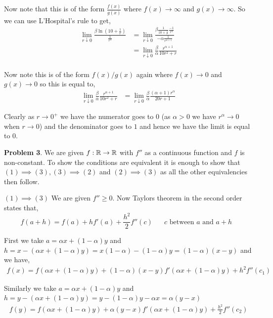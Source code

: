 \documentclass[a4paper]{article}
\begin{document}
Now note that this is of the form $\frac{f(x)}{g(x)}$ where $f(x) \to \infty$ and $g(x) \to \infty$. So we can use L'Hospital's rule to get, 
\begin{align*}
    \lim_{r \downarrow 0} \frac{\beta \ln  \left ( 10 + \frac{1}{r}\right )}{\frac{1}{r^{\alpha}}} &=  \lim_{r \downarrow 0}  \frac{\beta \frac{1}{10 + \frac{1}{r}} \frac{-1}{r^2}}{-\alpha \frac{1}{r^{\alpha + 1}}}\\
&=   \lim_{r \downarrow 0}  \frac{\beta}{\alpha} \frac{r^{\alpha + 1}}{10r^2 + r}\\
\end{align*}            

Now note this is of the form $f(x) / g(x) $ again where $f(x) \to 0$ and $g(x) \to 0$ so this is equal to, 
\begin{align*}
    \lim_{r \downarrow 0}  \frac{\beta}{\alpha} \frac{r^{\alpha + 1}}{10r^2 + r} &=     \lim_{r \downarrow 0}  \frac{\beta}{\alpha} \frac{(\alpha + 1)r^{\alpha}}{20r +  1}
\end{align*}

Clearly as $r \to 0^{+}$ we have the numerator goes to $0$ (as $\alpha > 0$ we have $r^{\alpha} \to 0$ when $r \to 0$) and the denominator goes to $1$ and hence we have the limit is equal to $0$.



\vspace{1em}


\textbf{Problem 3}. We are given $f: \mathbb{R} \to \mathbb{R}$ with $f''$ as a continuous function and $f$ is non-constant. To show the conditions are equivalent it is enough to show that $(1) \implies (3), (3) \implies (2)$ and $(2) \implies (3)$ as all the other equivalencies then follow.

\vspace{1em}
$(1) \implies (3)$ We are given $f'' \ge 0$. Now Taylors theorem in the second order states that,
\[
    f(a + h) = f(a) + hf'(a) + \frac{h^2}{2}f''(c) \quad \text{ $c$ between $a$ and $a + h$ }
\]

First we take $a = \alpha x + (1 - \alpha) y$ and $h = x - (\alpha x + (1 - \alpha) y) = x(1 - \alpha) - (1- \alpha)y = (1 - \alpha)(x - y)$ and we have,
\begin{align*}
    f(x) = f \left( \alpha x + (1 - \alpha)y \right) + (1 - \alpha)(x - y)f' \left( \alpha x + (1 - \alpha)y \right) +  h^2 f''(c_{1})
\end{align*}

Similarly we take $a = \alpha x + (1 - \alpha) y$ and $h = y - (\alpha x + (1 - \alpha) y) = y - (1 - \alpha)y - \alpha x = \alpha(y  - x)$
\begin{align*}
    f(y) = f \left(\alpha x + (1 - \alpha)y \right) + \alpha(y - x) f' \left(\alpha x + (1 - \alpha)y \right) + \frac{h^2}{2}f''(c_{2})
\end{align*}
\end{document}
